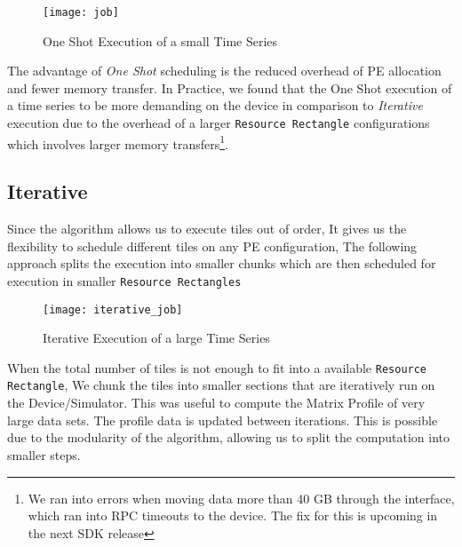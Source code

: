 \begin{figure}[h!]
    \texttt{[image: job]}
    \centering
    \caption{One Shot Execution of a small Time Series}
\end{figure}

The advantage of \textit{One Shot} scheduling is the reduced overhead of PE allocation and fewer memory transfer. In Practice, we found that the One Shot execution of a time series to be more demanding on the device in comparison to \textit{Iterative} execution due to the overhead of a larger \texttt{Resource Rectangle} configurations which involves larger memory transfers\footnote{We ran into errors when moving data more than 40 GB through the interface, which ran into RPC timeouts to the device. The fix for this is upcoming in the next SDK release}.

\subsection{Iterative} \label{section:iterative}

Since the algorithm allows us to execute tiles out of order, It gives us the flexibility to schedule different tiles on any PE configuration, The following approach splits the execution into smaller chunks which are then scheduled for execution in smaller \texttt{Resource Rectangles}

\begin{figure}[h!]
    \texttt{[image: iterative\_job]}
    \centering
    \caption{Iterative Execution of a large Time Series}
\end{figure}

When the total number of tiles is not enough to fit into a available \texttt{Resource Rectangle}, We chunk the tiles into smaller sections that are iteratively run on the Device/Simulator. This was useful to compute the Matrix Profile of very large data sets. The profile data is updated between iterations. This is possible due to the modularity of the algorithm, allowing us to split the computation into smaller steps.
